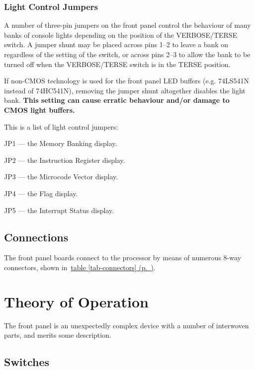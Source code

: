 \documentclass[11pt,a4paper,twocolumns]{article}
\newcommand{\cf}[2][section]{\hyperref[#2]{#1 \ref*{#2} (p.~\pageref*{#2})}}
\newcommand{\tcf}[1]{\cf[table]{#1}}
\newcommand{\sw}[1]{\textsf{#1}}
\newcommand{\schpt}[1]{\textsf{#1}}
\newcommand\caution[1]{\textcolor{caution}{\bf{#1}}}
\begin{document}
\subsubsection{Light Control Jumpers}

A number of three-pin jumpers on the front panel control the behaviour
of many banks of console lights depending on the position of the
\sw{VERBOSE}/\sw{TERSE} switch. A jumper shunt may be placed across
pins 1–2 to leave a bank on regardless of the setting of the switch,
or across pins 2–3 to allow the bank to be turned off when the
\sw{VERBOSE}/\sw{TERSE} switch is in the \sw{TERSE} position.

If non-CMOS technology is used for the front panel LED buffers (e.g. 74LS541N
instead of 74HC541N), removing the jumper shunt altogether disables the light
bank. \caution{This setting can cause erratic behaviour and/or damage to CMOS
  light buffers.}

This is a list of light control jumpers:

\begin{description}
\item{\schpt{JP1}} — the Memory Banking display. 
\item{\schpt{JP2}} — the Instruction Register display.
\item{\schpt{JP3}} — the Microcode Vector display.
\item{\schpt{JP4}} — the Flag display.
\item{\schpt{JP5}} — the Interrupt Status display.
\end{description}

\subsection{Connections}

The front panel boards connect to the processor by means of numerous
8-way connectors, shown in~\tcf{tab-connectors}.


\section{Theory of Operation}

The front panel is an unexpectedly complex device with a number of
interwoven parts, and merits some description.

\subsection{Switches}
\end{document}

